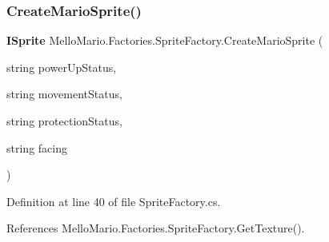 \mbox{\label{classMelloMario_1_1Factories_1_1SpriteFactory_a18d8829d06e8232ca574ab3c6adb5c3f}} 
\subsubsection{Create\+Mario\+Sprite()}
{\footnotesize\ttfamily \textbf{ I\+Sprite} Mello\+Mario.\+Factories.\+Sprite\+Factory.\+Create\+Mario\+Sprite (\begin{DoxyParamCaption}\item[{string}]{power\+Up\+Status,  }\item[{string}]{movement\+Status,  }\item[{string}]{protection\+Status,  }\item[{string}]{facing }\end{DoxyParamCaption})}



Definition at line 40 of file Sprite\+Factory.\+cs.



References Mello\+Mario.\+Factories.\+Sprite\+Factory.\+Get\+Texture().


